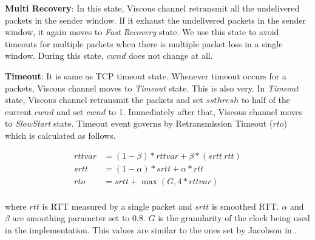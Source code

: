 {\bf Multi Recovery}: In this state, Viscous channel retransmit all the undelivered packets in the sender window. If it exhaust the undelivered packets in the sender window, it again moves to {\it Fast Recovery} state. We use this state to avoid timeouts for multiple packets when there is multiple packet loss in a single window. During this state, $cwnd$ does not change at all.

{\bf Timeout}: It is same as TCP timeout state. Whenever timeout occurs for a packets, Viscous channel moves to {\it Timeout} state. This is also very. In {\it Timeout} state, Viscous channel retransmit the packets and set $ssthresh$ to half of the current $cwnd$ and set $cwnd$ to 1. Immediately after that, Viscous channel moves to {\it SlowStart} state. Timeout event governs by Retransmission Timeout ($rto$) which is calculated as follows.

\begin{equation}
\begin{split}
rttvar &= (1-\beta) * rttvar + \beta * (srtt ~ rtt)\\
srtt &= (1-\alpha)*srtt + \alpha*rtt \\
rto &= srtt + \max(G, 4*rttvar) \\
\end{split}
\end{equation}

where $rtt$ is RTT measured by a single packet and $srtt$ is smoothed RTT. $\alpha$ and $\beta$ are smoothing parameter set to 0.8. $G$ is the granularity of the clock being used in the implementation. This values are similar to the ones set by Jacobson in \cite{Jacobson:1988:CAC:52325.52356,RFC2988}.



